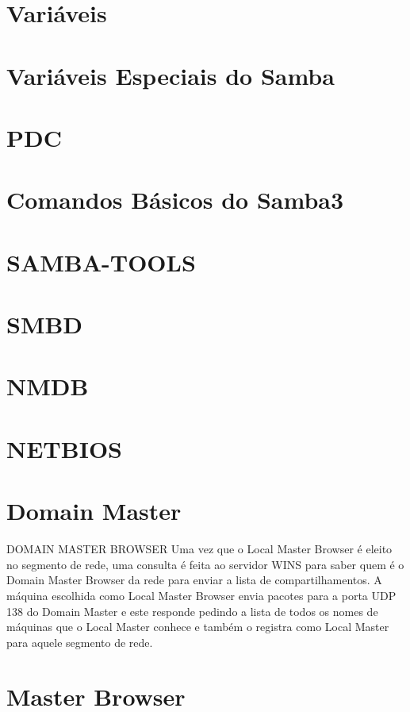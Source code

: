 \section{Variáveis}

\section{Variáveis Especiais do Samba}

\section{PDC}

\section{Comandos Básicos do Samba3}

\section{SAMBA-TOOLS}

\section{SMBD}

\section{NMDB}

\section{NETBIOS}

\section{Domain Master}

DOMAIN MASTER BROWSER Uma vez que o Local Master Browser é eleito no segmento de rede, uma consulta é feita ao servidor WINS para saber quem é o Domain Master Browser da rede para enviar a lista de compartilhamentos. A máquina escolhida como Local Master Browser envia pacotes para a porta UDP 138 do Domain Master e este responde pedindo a lista de todos os nomes de máquinas que o Local Master conhece e também o registra como Local Master para aquele segmento de rede.

\section{Master Browser}

